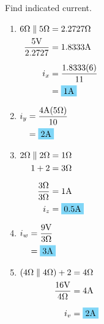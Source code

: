 Find indicated current.
\begin{enumerate}[leftmargin=2cm,labelsep=.5cm,label=\bfseries\alph*)]
	\item $
	\begin{aligned}[t]
	6\qw{\ohm}\parallel 5\qw{\ohm} &= 2.2727\qw{\ohm} \\
	\frac{5\qw{\V}}{2.2727} &= 1.8333 \qw{\A} \\[2mm]
	i_x &= \frac{1.8333(6)}{11} \\
	&= \hlbox{1\qw{\A}}
	\end{aligned} $
	\\[1cm]
	
	\item $
	\begin{aligned}[t]
	i_y &= \frac{4\qw{\A}(5\qw{\ohm})}{10} \\
	&= \hlbox{2\qw{\A}}
	\end{aligned} $
	\\[1cm]
	
	\item $       
	\begin{aligned}[t]
	2\qw{\ohm}\parallel 2\qw{\ohm} &= 1\qw{\ohm} \\
	1+2 &= 3 \qw{\ohm} \\[2mm]
	\frac{3\qw{\ohm}}{3\qw{\ohm}} &= 1\qw{\A} \\
	i_z &= \hlbox{0.5\qw{\A}}
	\end{aligned} $
	\\[1cm]
	
	\item $
	\begin{aligned}[t]
	i_w &= \frac{9\qw{\V}}{3\qw{\ohm}} \\
	&= \hlbox{3\qw{\A}}
	\end{aligned} $
	\\[1cm]
	
	\item $
	\begin{aligned}[t]
	(4\qw{\ohm}\parallel 4\qw{\ohm}) +2 &= 4\qw{\ohm} \\
	\frac{16\qw{\V}}{4\qw{\ohm}} &= 4 \qw{\A} \\[2mm]
	i_v &= \hlbox{2\qw{\A}}
	\end{aligned} $
	\\[1cm]
\end{enumerate}